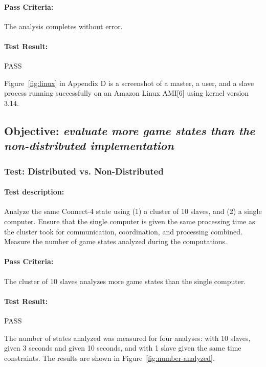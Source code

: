 \documentclass[pdftex,12pt,a4paper]{article}
\begin{document}
\paragraph{Pass Criteria:} The analysis completes without error.

\paragraph{Test Result:} PASS

Figure~\ref{fig:linux} in Appendix D is a screenshot of a master, a user, and a slave process running successfully on an Amazon Linux AMI[6] using kernel version 3.14.



\subsection{\textbf{Objective:} \emph{evaluate more game states than the non-distributed implementation}}\label{sec:obj-number-analyzed}

\subsubsection{\textbf{Test:} Distributed vs. Non-Distributed}\label{sec:number-analyzed}

\paragraph{Test description:} Analyze the same Connect-4 state using (1) a cluster of 10 slaves, and (2) a single computer. Ensure that the single computer is given the same processing time as the cluster took for communication, coordination, and processing combined. Measure the number of game states analyzed during the computations.

\paragraph{Pass Criteria:} The cluster of 10 slaves analyzes more game states than the single computer.

\paragraph{Test Result:} PASS

The number of states analyzed was measured for four analyses: with 10 slaves, given 3 seconds and given 10 seconds, and with 1 slave given the same time constraints. The results are shown in Figure~\ref{fig:number-analyzed}.
\end{document}

